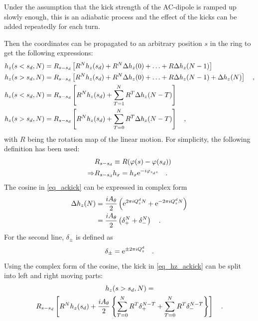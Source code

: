 Under the assumption that the kick strength of the AC-dipole is ramped up slowly enough, this is an
adiabatic process and the effect of the kicks can be added repeatedly for each turn.

Then the coordinates can be propagated to an arbitrary position $s$ in the ring to get the following
expressions:
%
\begin{align}
    h_z(s<s_d, N) &= R_{s-s_d}\left[R^N h_z(s_d) + R^N\Delta h_z(0) + \ldots + R\Delta h_z(N-1)\right] \notag\\
    h_z(s>s_d, N) &= R_{s-s_d}\left[R^N h_z(s_d) + R^N\Delta h_z(0) + \ldots + R\Delta h_z(N-1) + \Delta h_z(N)\right] 
    \quad ,\\
    h_z(s<s_d, N) &= R_{s-s_d}\left[R^N h_z(s_d) + \sum\limits_{T=1}^N R^T\Delta h_z(N-T)\right] \notag\\
    h_z(s>s_d, N) &= R_{s-s_d}\left[R^N h_z(s_d) + \sum\limits_{T=0}^N R^T\Delta h_z(N-T)\right]
    \quad ,
    \label{eq_hz_ackick}
\end{align}
%
with $R$ being the rotation map of the linear motion. For simplicity, the following definition has been used:
%
\begin{align}
    &R_{s-s_d} \equiv R(\varphi(s) - \varphi(s_d))\\
    \Rightarrow &R_{s-s_d} h_x = h_x \text{e}^{-i\varphi_{s_d s}}
    \quad .
\end{align}
%
The cosine in \eqref{eq_ackick} can be expressed in complex form
%
\begin{align}
    \Delta h_z(N) &= \frac{iA_\theta}{2} \left(
        \text{e}^{2\pi i Q^{d}_{z} N} +
        \text{e}^{-2\pi i Q^{d}_{z} N}
    \right) \notag\\
    &= \frac{iA_\theta}{2} \left(
        \delta_+^N + \delta_-^N
    \right)
    \quad .
\end{align}
%
For the second line, $\delta_\pm$ is defined as
%
\begin{equation}
    \delta_\pm = \text{e}^{\pm 2\pi i Q^{d}_{z}}
    \quad .
\end{equation}
%
Using the complex form of the cosine, the kick in \eqref{eq_hz_ackick} can be split into left and right moving parts:
%
\begin{multline}
    h_z(s>s_d, N) = \\
    R_{s-s_d}\left[
        R^N h_z(s_d) +
        \frac{iA_\theta}{2}\left\{
            \sum\limits_{T=0}^N R^T \delta_+^{N-T}
            + \sum\limits_{T=0}^N R^T \delta_-^{N-T}
        \right\}
        \right]
    \quad .
\end{multline}
